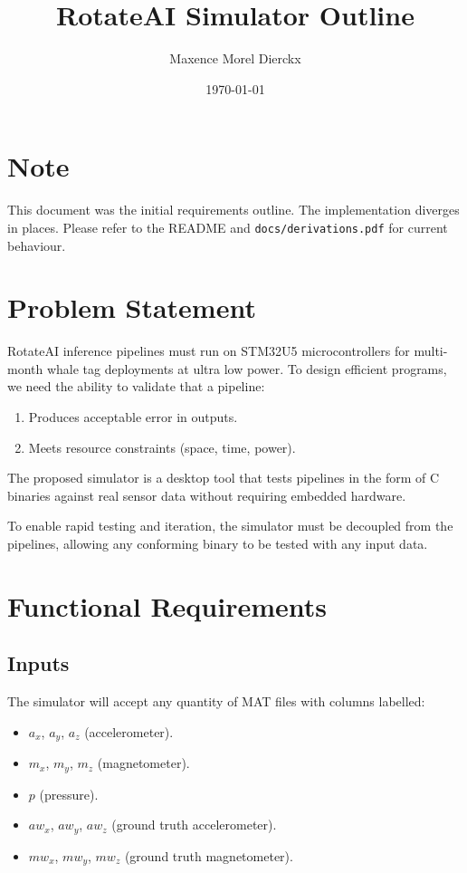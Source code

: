 \documentclass{article}
\title{RotateAI Simulator Outline}
\author{Maxence Morel Dierckx}
\date{\today}
\begin{document}
\maketitle

\section{Note}
This document was the initial requirements outline. The implementation diverges in places. Please refer to the README and \verb|docs/derivations.pdf| for current behaviour.

\section{Problem Statement}
RotateAI inference pipelines must run on STM32U5 microcontrollers for multi-month whale tag deployments at ultra low power. To design efficient programs, we need the ability to validate that a pipeline:

\begin{enumerate}
	\item Produces acceptable error in outputs.
	\item Meets resource constraints (space, time, power).
\end{enumerate}

The proposed simulator is a desktop tool that tests pipelines in the form of C binaries against real sensor data without requiring embedded hardware.

To enable rapid testing and iteration, the simulator must be decoupled from the pipelines, allowing any conforming binary to be tested with any input data.

\section{Functional Requirements}

\subsection{Inputs}

The simulator will accept any quantity of MAT files with columns labelled:
\begin{itemize}
    \item $a_x$, $a_y$, $a_z$ (accelerometer).
    \item $m_x$, $m_y$, $m_z$ (magnetometer).
    \item $p$ (pressure).
    \item $aw_x$, $aw_y$, $aw_z$ (ground truth accelerometer).
    \item $mw_x$, $mw_y$, $mw_z$ (ground truth magnetometer).\\
\end{itemize}
\end{document}
